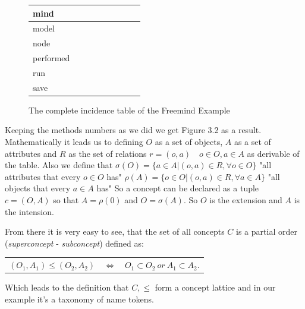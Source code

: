 \begin{figure}
\begin{tabular}{| l | c | c | c | c | c | c | c | c |}
      mind 		& \checkmark	& \checkmark & \checkmark  & \checkmark & \checkmark & \checkmark  & \checkmark & \checkmark \\ \hline
      model 		& \checkmark	& \checkmark & \checkmark  & \checkmark & \checkmark & \checkmark  & \checkmark & \checkmark \\ \hline
      node 		&			    	&                    &                     &                    &                    & \checkmark  & \checkmark &                     \\ \hline
      performed 	&			    	&                    &                     &                    &                    &                     &                    & \checkmark  \\ \hline
      run 			& \checkmark 	&                    &                     &                    &                    &                     &                    &                     \\ \hline
      save 		& \checkmark	& \checkmark & \checkmark  &			     & \checkmark & \checkmark  & \checkmark &				 \\ \hline
    \end{tabular}
     \caption{The complete incidence table of the Freemind Example}
     \label{FCA_finaltable}
\end{figure}


Keeping the methods numbers  as we did we get Figure 3.2 as a result. Mathematically it leads us to defining $O$ as a set of objects, $A$ as a set of attributes and $R$ as the set of relations $r = (o,a) \quad o\in O,a\in A$ as derivable of the table. Also we define that \newline
$\sigma(O) = \{a \in A | (o,a) \in R, \forall o \in O \}$  \quad "all attributes that every $o\in O$ has" \newline
 $\rho(A)= \{o\in O|(o,a)\in R, \forall a\in A \}$  \quad "all objects that every $a\in A$ has" \newline
So a concept can be declared as a tuple $c=(O,A)$ so that $A=\rho(0)$ and $O=\sigma(A)$. So $O$ is the extension and $A$ is the intension.

From there it is very easy to see, that the set of all concepts $C$ is a partial order (\emph{superconcept} - \emph{subconcept}) defined as: \newline
\begin{center}
  \vspace{-2em}
  \begin{tabular}{ r c l }
  $ (O_1,A_1) \le (O_2, A_2)$ & $\Leftrightarrow$ & $O_1 \subset O_2 \ or \ A_1 \subset A_2$. \\
  \end{tabular}
\end{center}
\vspace{-1em}
Which leads to the definition that $C, \le$ form a concept lattice and in our example it's a taxonomy of name tokens.

